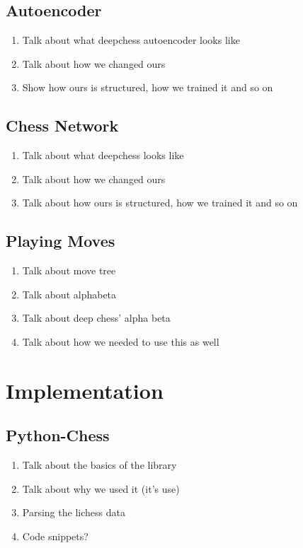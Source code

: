 \documentclass[12pt]{article}
\begin{document}
    \subsection{Autoencoder}

    \begin{enumerate}
        \item Talk about what deepchess autoencoder looks like
        \item Talk about how we changed ours 
        \item Show how ours is structured, how we trained it and so on
    \end{enumerate}

    \subsection{Chess Network}

    \begin{enumerate}
        \item Talk about what deepchess looks like 
        \item Talk about how we changed ours 
        \item Talk about how ours is structured, how we trained it and so on
    \end{enumerate}

    \subsection{Playing Moves}

    \begin{enumerate}
        \item Talk about move tree 
        \item Talk about alphabeta
        \item Talk about deep chess' alpha beta 
        \item Talk about how we needed to use this as well 
    \end{enumerate}
    
    \section{Implementation}

    \subsection{Python-Chess}

    \begin{enumerate}
        \item Talk about the basics of the library
        \item Talk about why we used it (it's use)
        \item Parsing the lichess data
        \item Code snippets?
    \end{enumerate}
\end{document}
